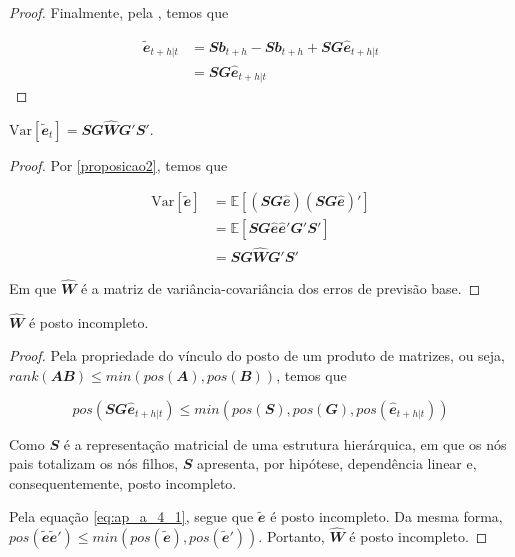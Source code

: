 \begin{apendicesenv}
\begin{proof}
  Finalmente, pela , temos que

  \begin{align}
    \mathbfit{\tilde{e}}_{t+h|t} &=  \mathbfit{Sb}_{t+h} - \mathbfit{Sb}_{t+h}  + \mathbfit{SG\hat{e}}_{t+h|t}  \\
    &= \mathbfit{SG\hat{e}}_{t+h|t}
  \end{align}
\end{proof}

\begin{proposition}
  \label{proposicao3}

  $\text{Var}[\mathbfit{\tilde{e}}_t] = \mathbfit{SG\hat{W}G'S'}$.

\end{proposition}

\begin{proof}
  Por \ref{proposicao2}, temos que

  \begin{align}
    \text{Var}[\mathbfit{\tilde{e}}] &= \mathbb{E}[\mathbfit{(SG\hat{e})(SG\hat {e})'}] \\
    &= \mathbb{E}[\mathbfit{SG\hat{e}\hat{e}'G'S'}] \\
    &= \mathbfit{SG\hat{W}G'S'}
  \end{align}

  Em que $\mathbfit{\hat{W}}$ é a matriz de variância-covariância dos erros de  previsão base.
\end{proof}

\begin{proposition}
  \label{proposicao4}

  $\mathbfit{\hat{W}}$ é posto incompleto.

\end{proposition}

\begin{proof}
  Pela propriedade do vínculo do posto de um produto de matrizes, ou seja, $rank(\mathbfit{AB}) \leq min(pos(\mathbfit{A}), pos(\mathbfit{B}))$, temos que
  
  \begin{equation}
    pos(\mathbfit{SG\hat{e}}_{t+h|t}) \leq min(pos(\mathbfit{S}), pos(\mathbfit{G}), pos(\mathbfit{\hat{e}}_{t+h|t})) \label{eq:ap_a_4_1}
  \end{equation}

  Como $\mathbfit{S}$ é a representação matricial de uma estrutura hierárquica, em que os nós pais totalizam os nós filhos, $\mathbfit{S}$ apresenta, por hipótese, dependência linear e, consequentemente, posto incompleto.

  Pela equação \eqref{eq:ap_a_4_1}, segue que $\mathbfit{\tilde{e}}$ é posto incompleto. Da mesma forma, $pos(\mathbfit{\tilde{e}\tilde{e}'}) \leq min(pos(\mathbfit{\tilde{e}}), pos(\mathbfit{\tilde{e}'}))$. Portanto, $\mathbfit{\hat{W}}$ é posto incompleto.
\end{proof}

\end{apendicesenv}

